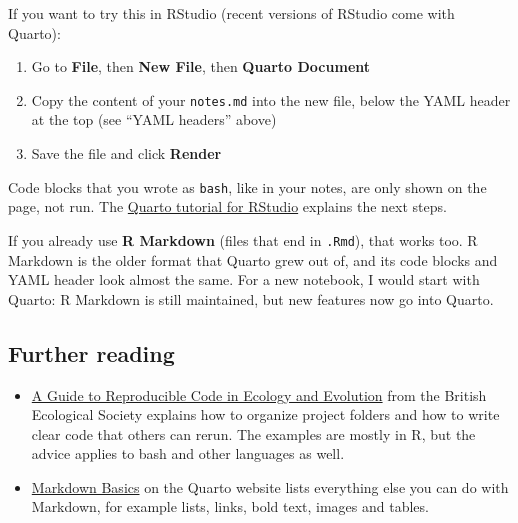 \documentclass[
  letterpaper,
  DIV=11,
  numbers=noendperiod]{scrreprt}
\providecommand{\tightlist}{%
  \setlength{\itemsep}{0pt}\setlength{\parskip}{0pt}}
\begin{document}
If you want to try this in RStudio (recent versions of RStudio come with
Quarto):

\begin{enumerate}
\def\labelenumi{\arabic{enumi}.}
\tightlist
\item
  Go to \textbf{File}, then \textbf{New File}, then \textbf{Quarto
  Document}
\item
  Copy the content of your \texttt{notes.md} into the new file, below
  the YAML header at the top (see ``YAML headers'' above)
\item
  Save the file and click \textbf{Render}
\end{enumerate}

Code blocks that you wrote as
\texttt{\textasciigrave{}\textasciigrave{}\textasciigrave{}bash}, like
in your notes, are only shown on the page, not run. The
\href{https://quarto.org/docs/get-started/hello/rstudio.html}{Quarto
tutorial for RStudio} explains the next steps.

If you already use \textbf{R Markdown} (files that end in
\texttt{.Rmd}), that works too. R Markdown is the older format that
Quarto grew out of, and its code blocks and YAML header look almost the
same. For a new notebook, I would start with Quarto: R Markdown is still
maintained, but new features now go into Quarto.

\subsection{Further reading}\label{further-reading}

\begin{itemize}
\tightlist
\item
  \href{https://assets.britishecologicalsociety.org/2017/12/guide-to-reproducible-code.pdf}{A
  Guide to Reproducible Code in Ecology and Evolution} from the British
  Ecological Society explains how to organize project folders and how to
  write clear code that others can rerun. The examples are mostly in R,
  but the advice applies to bash and other languages as well.
\item
  \href{https://quarto.org/docs/authoring/markdown-basics.html}{Markdown
  Basics} on the Quarto website lists everything else you can do with
  Markdown, for example lists, links, bold text, images and tables.
\end{itemize}
\end{document}
